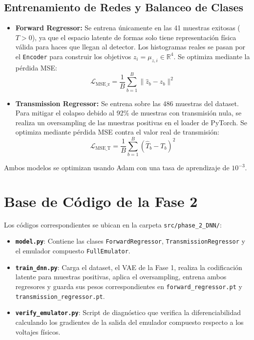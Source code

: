 \documentclass[12pt,letterpaper]{article}
\begin{document}
\subsection{Entrenamiento de Redes y Balanceo de Clases}
\begin{itemize}
    \item \textbf{Forward Regressor:} Se entrena únicamente en las 41 muestras exitosas ($T > 0$), ya que el espacio latente de formas solo tiene representación física válida para haces que llegan al detector. Los histogramas reales se pasan por el \texttt{Encoder} para construir los objetivos $z_i = \mu_{z,i} \in \mathbb{R}^4$. Se optimiza mediante la pérdida MSE:
    \begin{equation}
        \mathcal{L}_{\text{MSE\_z}} = \frac{1}{B} \sum_{b=1}^{B} \|\hat{z}_b - z_b\|^2
    \end{equation}
    \item \textbf{Transmission Regressor:} Se entrena sobre las 486 muestras del dataset. Para mitigar el colapso debido al 92\% de muestras con transmisión nula, se realiza un oversampling de las muestras positivas en el loader de PyTorch. Se optimiza mediante pérdida MSE contra el valor real de transmisión:
    \begin{equation}
        \mathcal{L}_{\text{MSE\_T}} = \frac{1}{B} \sum_{b=1}^{B} (\hat{T}_b - T_b)^2
    \end{equation}
\end{itemize}
Ambos modelos se optimizan usando Adam con una tasa de aprendizaje de $10^{-3}$.

\section{Base de Código de la Fase 2}
Los códigos correspondientes se ubican en la carpeta \texttt{src/phase\_2\_DNN/}:
\begin{itemize}
    \item \textbf{\texttt{model.py}}: Contiene las clases \texttt{ForwardRegressor}, \texttt{TransmissionRegressor} y el emulador compuesto \texttt{FullEmulator}.
    \item \textbf{\texttt{train\_dnn.py}}: Carga el dataset, el VAE de la Fase 1, realiza la codificación latente para muestras positivas, aplica el oversampling, entrena ambos regresores y guarda sus pesos correspondientes en \texttt{forward\_regressor.pt} y \texttt{transmission\_regressor.pt}.
    \item \textbf{\texttt{verify\_emulator.py}}: Script de diagnóstico que verifica la diferenciabilidad calculando los gradientes de la salida del emulador compuesto respecto a los voltajes físicos.
\end{itemize}
\end{document}
